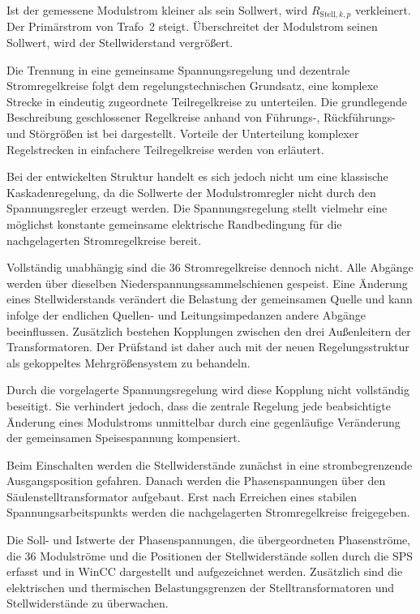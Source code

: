 Ist der gemessene Modulstrom kleiner als sein Sollwert, wird
\(R_{\mathrm{Stell},k,p}\) verkleinert. Der Primärstrom von Trafo~2
steigt. Überschreitet der Modulstrom seinen Sollwert, wird der
Stellwiderstand vergrößert.

Die Trennung in eine gemeinsame Spannungsregelung und dezentrale
Stromregelkreise folgt dem regelungstechnischen Grundsatz, eine
komplexe Strecke in eindeutig zugeordnete Teilregelkreise zu
unterteilen. Die grundlegende Beschreibung geschlossener
Regelkreise anhand von Führungs-, Rückführungs- und Störgrößen ist bei
\textcite[Abschn.~3.4, S.~96--102]
{schroeder2021elektrische_antriebe} dargestellt. Vorteile der
Unterteilung komplexer Regelstrecken in einfachere Teilregelkreise
werden von
\textcite[Abschn.~4.3, S.~153--155]
{schroeder2021elektrische_antriebe} erläutert.

Bei der entwickelten Struktur handelt es sich jedoch nicht um eine
klassische Kaskadenregelung, da die Sollwerte der Modulstromregler
nicht durch den Spannungsregler erzeugt werden. Die Spannungsregelung
stellt vielmehr eine möglichst konstante gemeinsame elektrische
Randbedingung für die nachgelagerten Stromregelkreise bereit.

Vollständig unabhängig sind die 36 Stromregelkreise dennoch nicht.
Alle Abgänge werden über dieselben Niederspannungssammelschienen
gespeist. Eine Änderung eines Stellwiderstands verändert die Belastung
der gemeinsamen Quelle und kann infolge der endlichen
Quellen- und Leitungsimpedanzen andere Abgänge beeinflussen.
Zusätzlich bestehen Kopplungen zwischen den drei Außenleitern der
Transformatoren. Der Prüfstand ist daher auch mit der neuen
Regelungsstruktur als gekoppeltes Mehrgrößensystem zu behandeln.

Durch die vorgelagerte Spannungsregelung wird diese Kopplung nicht
vollständig beseitigt. Sie verhindert jedoch, dass die zentrale
Regelung jede beabsichtigte Änderung eines Modulstroms unmittelbar
durch eine gegenläufige Veränderung der gemeinsamen Speisespannung
kompensiert.

Beim Einschalten werden die Stellwiderstände zunächst in eine
strombegrenzende Ausgangsposition gefahren. Danach werden die
Phasenspannungen über den Säulenstelltransformator aufgebaut. Erst
nach Erreichen eines stabilen Spannungsarbeitspunkts werden die
nachgelagerten Stromregelkreise freigegeben.

Die Soll- und Istwerte der Phasenspannungen, die übergeordneten
Phasenströme, die 36 Modulströme und die Positionen der
Stellwiderstände sollen durch die SPS erfasst und in WinCC dargestellt
und aufgezeichnet werden. Zusätzlich sind die elektrischen und
thermischen Belastungsgrenzen der Stelltransformatoren und
Stellwiderstände zu überwachen.

